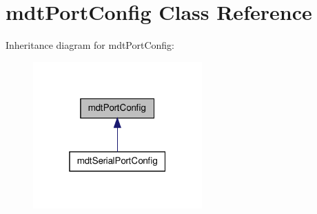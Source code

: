 \hypertarget{classmdt_port_config}{
\section{mdtPortConfig Class Reference}
\label{classmdt_port_config}
}


Inheritance diagram for mdtPortConfig:\nopagebreak
\begin{figure}[H]
\begin{center}
\leavevmode
\includegraphics[width=184pt]{classmdt_port_config__inherit__graph}
\end{center}
\end{figure}
